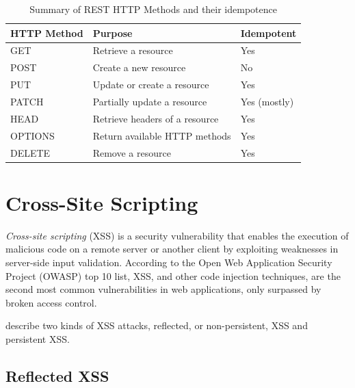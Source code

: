 \begin{table}[htb]
    \centering
    \begin{tabular}{@{}lll@{}}
        \toprule
        \textbf{HTTP Method} & \textbf{Purpose}                         & \textbf{Idempotent} \\ \midrule
        GET                   & Retrieve a resource                     & Yes                 \\
        POST                  & Create a new resource                   & No                  \\
        PUT                   & Update or create a resource             & Yes                 \\
        PATCH                 & Partially update a resource             & Yes (mostly)        \\
        HEAD                  & Retrieve headers of a resource         & Yes                 \\
        OPTIONS               & Return available HTTP methods           & Yes                 \\
        DELETE                & Remove a resource                       & Yes                 \\ \bottomrule
    \end{tabular}
    \caption[List of HTTP Methods]{Summary of REST HTTP Methods and their idempotence \cite[chapter 9]{fielding_http_2022}}
    \label{tab:rest_http_methods}
\end{table}
\FloatBarrier

\section{Cross-Site Scripting}
\label{sec:xss}
\textit{Cross-site scripting} (XSS) is a security vulnerability that enables the execution of malicious code on a remote server or
another client by exploiting weaknesses in server-side input validation. \cite{bisht_xss-guard_2008}
According to the Open Web Application Security Project (OWASP) top 10 list, XSS, and other code injection techniques, are the second most common vulnerabilities in web applications, only surpassed by broken access control.\cite{noauthor_owasp_2025}

\citet{tang_identifying_2012} describe two kinds of XSS attacks, reflected, or non-persistent, XSS and persistent XSS.
\subsection{Reflected XSS}

